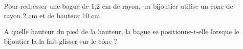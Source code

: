 
Pour redresser une bague de 1,2 cm de rayon, un bijoutier utilise un cone de rayon 2 cm et de hauteur 10 cm. 

A quelle hauteur du pied de la hauteur, la bague se positionne-t-elle lorsque le bijoutier la la fait glisser sur le cône ?